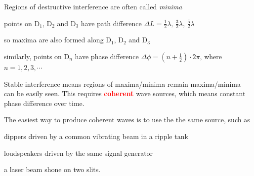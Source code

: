 \documentclass[a4paper,12pt]{book}
\newcommand{\keypoint}[1]{\textbf{\textcolor{red}{#1}}}
\newcommand{\keypoint}[1]{\textbf{\textcolor{red}{#1}}}
\begin{document}
Regions of destructive interference are often called \emph{minima}

\begin{compactitem}
	\item[--] points on D$_1$, D$_2$ and D$_3$ have path difference $\Delta L = \frac{1}{2}\lambda, \, \frac{3}{2}\lambda, \, \frac{5}{2}\lambda$
	
	so maxima are also formed along D$_1$, D$_2$ and D$_3$
	
	\item[--] similarly, points on D$_n$ have phase difference $\Delta \phi = \left( n+\frac{1}{2} \right) \cdot 2\pi$, where $n=1,2,3,\cdots$
\end{compactitem} 

\newpage

Stable interference means regions of maxima/minima remain maxima/minima can be easily seen. This requires \keypoint{coherent} wave sources, which means constant phase difference over time.

The easiest way to produce coherent waves is to use the the same source, such as

\begin{compactitem}
	\item[--] dippers driven by a common vibrating beam in a ripple tank
	
	\item[--] loudspeakers driven by the same signal generator
 \item[--] a laser beam shone on two slits.
\end{compactitem}
\end{document}
